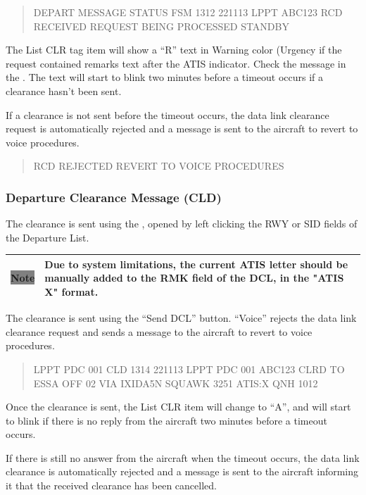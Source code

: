 \documentclass[a4paper,oneside,11pt]{memoir}
\newcommand{\colorref}[1]{\colorbox{Flight Highlight}{\color{#1}#1}}
\newcommand{\winref}[1]{\textit{\titleref{#1}}}
\newcommand{\note}[1]{
  \begin{center}
    
    \begin{tabular}{| P{1.5cm}|p{10.5cm} |}
      \hline
      \cellcolor{shadecolor}\colorbox{gray}{\color{white}Note} &\cellcolor{shadecolor} #1 \\ \hline
    \end{tabular}
  \end{center}
}
\begin{document}
\begin{quote}
  DEPART MESSAGE STATUS FSM 1312 221113 LPPT ABC123 RCD RECEIVED REQUEST BEING PROCESSED STANDBY 
\end{quote}

The List CLR tag item will show a “R” text in \colorref{Warning} color (\colorref{Urgency} if the request contained remarks text after the ATIS indicator. Check the message in the \winref{win:dlcmw}. The text will start to blink two minutes before a timeout occurs if a clearance hasn’t been sent.

\bigskip

If a clearance is not sent before the timeout occurs, the data link clearance request is automatically rejected and a message is sent to the aircraft to revert to voice procedures.

\begin{quote}
  RCD REJECTED REVERT TO VOICE PROCEDURES
\end{quote}

\subsubsection{Departure Clearance Message (CLD)}

The clearance is sent using the \winref{win:dlpdcw}, opened by left clicking the RWY or SID fields of the Departure List. 

\note{Due to system limitations, the current ATIS letter should be manually added to the RMK field of the DCL, in the "ATIS X" format.}

The clearance is sent using the “Send DCL” button. “Voice” rejects the data link clearance request and sends a message to the aircraft to revert to voice procedures. 

\begin{quote}
  LPPT PDC 001 CLD 1314 221113 LPPT PDC 001 ABC123 CLRD TO ESSA OFF 02 VIA IXIDA5N SQUAWK 3251 ATIS:X QNH 1012
\end{quote}

Once the clearance is sent, the List CLR item will change to “A”, and will start to blink if there is no reply from the aircraft two minutes before a timeout occurs.

\bigskip

If there is still no answer from the aircraft when the timeout occurs, the data link clearance is automatically rejected and a message is sent to the aircraft informing it that the received clearance has been cancelled.
\end{document}
